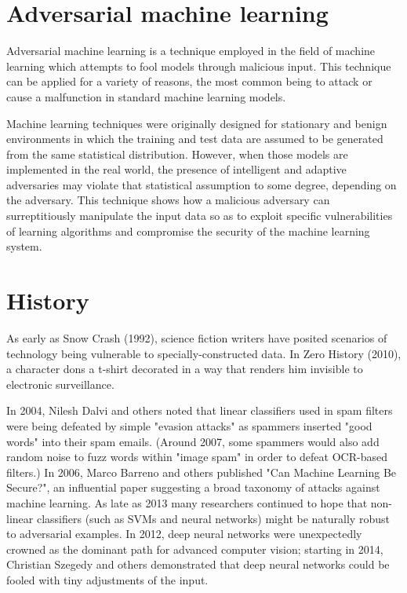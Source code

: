 \section{Adversarial machine learning}
	
	Adversarial machine learning is a technique employed in the field of machine learning which attempts to fool models through malicious input. This technique can be applied for a variety of reasons, the most common being to attack or cause a malfunction in standard machine learning models.

Machine learning techniques were originally designed for stationary and benign environments in which the training and test data are assumed to be generated from the same statistical distribution. However, when those models are implemented in the real world, the presence of intelligent and adaptive adversaries may violate that statistical assumption to some degree, depending on the adversary. This technique shows how a malicious adversary can surreptitiously manipulate the input data so as to exploit specific vulnerabilities of learning algorithms and compromise the security of the machine learning system.\cite{lim2019algorithmic,goodfellow2018making}

		\section{History}
		As early as Snow Crash (1992), science fiction writers have posited scenarios of technology being vulnerable to specially-constructed data. In Zero History (2010), a character dons a t-shirt decorated in a way that renders him invisible to electronic surveillance.\cite{vincent2017magic}

In 2004, Nilesh Dalvi and others noted that linear classifiers used in spam filters were being defeated by simple "evasion attacks" as spammers inserted "good words" into their spam emails. (Around 2007, some spammers would also add random noise to fuzz words within "image spam" in order to defeat OCR-based filters.) In 2006, Marco Barreno and others published "Can Machine Learning Be Secure?", an influential paper suggesting a broad taxonomy of attacks against machine learning. As late as 2013 many researchers continued to hope that non-linear classifiers (such as SVMs and neural networks) might be naturally robust to adversarial examples. In 2012, deep neural networks were unexpectedly crowned as the dominant path for advanced computer vision; starting in 2014, Christian Szegedy and others demonstrated that deep neural networks could be fooled with tiny adjustments of the input.\cite{biggio2018wild}



